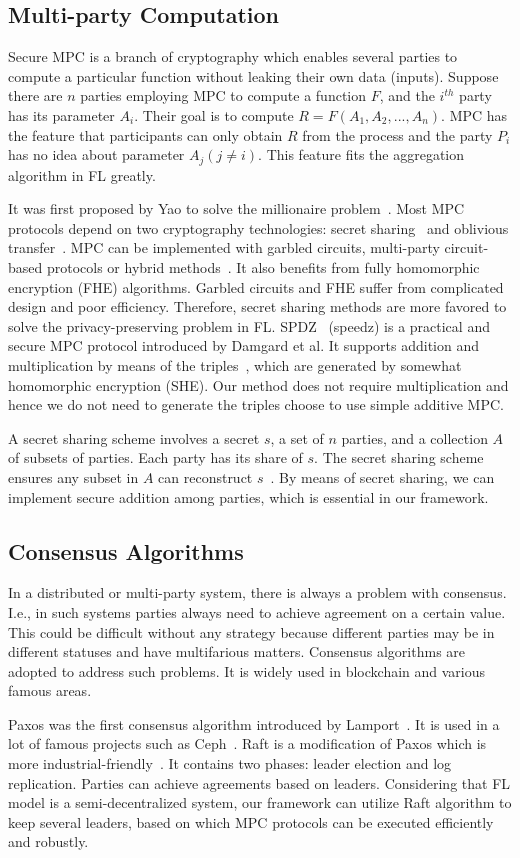 \subsection{Multi-party Computation}
Secure MPC is a branch of cryptography which enables several parties to compute a particular function without leaking their own data (inputs). Suppose there are $n$ parties employing MPC to compute a function $F$, and the $i^{th}$ party has its parameter $A_i$. Their goal is to compute $R = F(A_1, A_2, ..., A_n)$. MPC has the feature that participants can only obtain $R$ from the process and the party $P_i$ has no idea about parameter $A_j (j \ne i)$. This feature fits the aggregation algorithm in FL greatly.

It was first proposed by Yao to solve the millionaire problem~\cite{Yao}. Most MPC protocols depend on two cryptography technologies: secret sharing~\cite{Shamir} and oblivious transfer~\cite{OT}. MPC can be implemented with garbled circuits, multi-party circuit-based protocols or hybrid methods~\cite{mpc-sok}. It also benefits from fully homomorphic encryption (FHE) algorithms. Garbled circuits and FHE suffer from complicated design and poor efficiency. Therefore, secret sharing methods are more favored to solve the privacy-preserving problem in FL. SPDZ~\cite{SPDZ} (speedz) is a practical and secure MPC protocol introduced by Damgard et al. It supports addition and multiplication by means of the triples~\cite{Triple}, which are generated by somewhat homomorphic encryption (SHE). Our method does not require multiplication and hence we do not need to generate the triples choose to use simple additive MPC.

A secret sharing scheme involves a secret $s$, a set of $n$ parties, and a collection $A$ of subsets of parties. Each party has its share of $s$. The secret sharing scheme ensures any subset in $A$ can reconstruct $s$~\cite{Secret-Sharing-survey}. By means of secret sharing, we can implement secure addition among parties, which is essential in our framework.


\subsection{Consensus Algorithms}
In a distributed or multi-party system, there is always a problem with consensus. I.e., in such systems parties always need to achieve agreement on a certain value. This could be difficult without any strategy because different parties may be in different statuses and have multifarious matters. Consensus algorithms are adopted to address such problems. It is widely used in blockchain and various famous areas.

Paxos was the first consensus algorithm introduced by Lamport~\cite{Paxos}. It is used in a lot of famous projects such as Ceph~\cite{Ceph}. Raft is a modification of Paxos which is more industrial-friendly~\cite{Raft}. It contains two phases: leader election and log replication. Parties can achieve agreements based on leaders. Considering that FL model is a semi-decentralized system, our framework can utilize Raft algorithm to keep several leaders, based on which MPC protocols can be executed efficiently and robustly.
